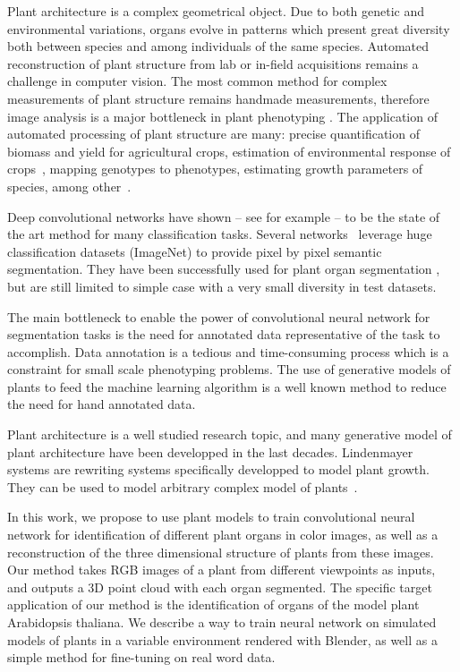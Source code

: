 Plant architecture is a complex geometrical object. Due to both genetic and
environmental variations, organs evolve in patterns which present great diversity
both between species and among individuals of the same species. Automated
reconstruction of plant structure from lab or in-field acquisitions remains a challenge in computer
vision. The most common method for complex measurements of plant structure
remains handmade measurements, therefore image analysis is a major bottleneck in plant phenotyping
\cite{minervini2015image}. The application of automated processing of plant structure are many: precise
quantification of biomass and yield for agricultural crops, estimation of environmental response
of crops~\cite{peirone2018assessing, srivastava2017drought},  mapping genotypes to
phenotypes, estimating growth parameters of species, among other~\cite{denis1998symmetry}.

Deep convolutional networks have shown -- see for example \cite{krizhevsky2012imagenet} --
to be the state of the art method for many classification tasks. Several
networks~\cite{ronneberger2015u, long2015fully} leverage huge classification datasets (ImageNet) to provide pixel by
pixel semantic segmentation. They have been successfully used for plant organ
segmentation \cite{shi2019plant}, but are still limited to simple case with a very
small diversity in test datasets.

The main bottleneck to enable the power of convolutional neural network for segmentation
tasks is the need for annotated data representative of the task to accomplish.
Data annotation is a tedious and time-consuming process
which is a constraint for small scale phenotyping problems. The use of generative
models of plants to feed the machine learning algorithm is a well known method to
reduce the need for hand annotated data.

Plant architecture is a well studied research topic, and many generative model
of plant architecture have been developped in the last decades. Lindenmayer
systems are rewriting systems specifically developped to model plant growth.
They can be used to model arbitrary complex model of plants~\cite{boudon_l-py:_2012}.

In this work, we propose to use plant models to train convolutional neural network for
identification of different plant organs in color images, as well as a
reconstruction of the three dimensional structure of plants from these images. Our method takes RGB images of a plant from different viewpoints as inputs, and outputs a 3D point cloud with each organ segmented.
The specific target application of our method is the identification of organs of the model
plant Arabidopsis thaliana. We describe a way to train neural network on simulated models of
plants in a variable environment rendered with Blender, as well as a simple method for
fine-tuning on real word data. 



